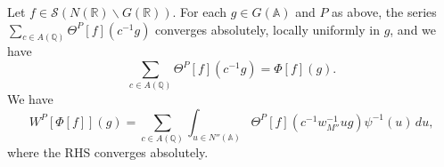 \begin{lemma}\label{lem:sub-gln:each-g-in}
  Let $f \in \mathcal{S}(N(\mathbb{R}) \backslash G(\mathbb{R}))$.  For each $g \in G(\mathbb{A})$ and $P$ as above, the series $\sum_{c \in A(\mathbb{Q}) } \Theta^P[f](c^{-1} g)$ converges absolutely, locally uniformly in $g$, and we have
  \begin{equation}\label{eq:sum-_c-in-1}
    \sum_{c \in A(\mathbb{Q}) } \Theta^P[f](c^{-1} g) = \Phi[f](g).
  \end{equation}
  We have
  \begin{equation}\label{eq:wpphif_inftyg-=-sum}
    W^P[\Phi[f]](g) = \sum_{c \in A(\mathbb{Q})}
    \int_{u \in N''(\mathbb{A})}
    \Theta^P[f]
    (
    c^{-1} w_{M''}^{-1} u g
    )
    \psi^{-1}(u) \, d u,
  \end{equation}
  where the RHS converges absolutely.
\end{lemma}
